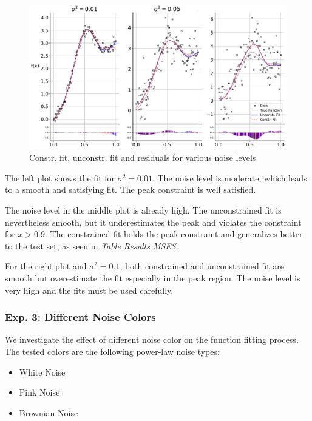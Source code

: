 \documentclass[10pt,a4paper]{article}
\begin{document}
\begin{figure}[H]
	\centering
	\includegraphics[width=\columnwidth]{../thesisplots/exp_noise_levels.pdf}
	\caption{Constr. fit, unconstr. fit and residuals for various noise levels}
	\label{fig:fit_noise_levels}
\end{figure}

The left plot shows the fit for $\sigma^2 = 0.01$. The noise level is moderate, which leads to a smooth and satisfying fit. The peak constraint is well satisfied. 

The noise level in the middle plot is already high. The unconstrained fit is nevertheless smooth, but it underestimates the peak and violates the constraint for $x > 0.9$. The constrained fit holds the peak constraint and generalizes better to the test set, as seen in \emph{Table Results MSES}.  

For the right plot and $\sigma^2=0.1$, both constrained and unconstrained fit are smooth but overestimate the fit especially in the peak region. The noise level is very high and the fits must be used carefully.

\subsubsection{Exp. 3: Different Noise Colors}

We investigate the effect of different noise color on the function fitting process. The tested colors are the following power-law noise types:

\begin{itemize}
	\item  White Noise
	\item Pink Noise
	\item Brownian Noise
\end{itemize}
\end{document}
